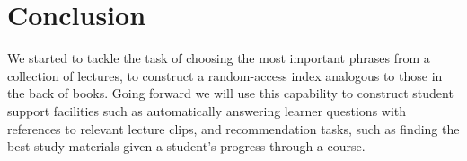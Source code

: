 \section{Conclusion}
\label{sec:conclusion}

We started to tackle the task of choosing the most important
phrases from a collection of lectures, to construct a random-access
index analogous to those in the back of books.  Going forward we will
use this capability to construct student support facilities such as
automatically answering learner questions with references to relevant
lecture clips, and recommendation tasks, such as finding the best
study materials given a student's progress through a course.


